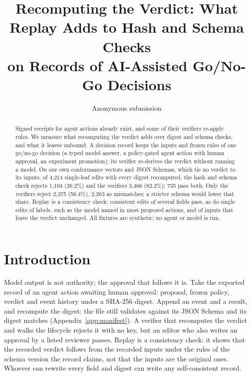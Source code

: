 \documentclass[letterpaper]{article} %
\title{Recomputing the Verdict: What Replay Adds to Hash and Schema Checks\\
on Records of AI-Assisted Go/No-Go Decisions}
\author{Anonymous submission}
\author{\paperauthor}
\makeatletter
\def\code@keepspaces{\Url@Edit\Url@String{ }{+}}}
\DeclareRobustCommand{\code}{\leavevmode\begingroup \urlstyle{tt}%
  \let\Url@ObeySp\code@keepspaces \def\Url@space{\penalty\UrlBreakPenalty\ }\Url}
\makeatother
\begin{document}
\maketitle

\begin{abstract}
Signed receipts for agent actions already exist, and some of their verifiers
re-apply rules. We measure what recomputing the verdict adds over digest and
schema checks, and what it leaves unbound. A decision record keeps the inputs
and frozen rules of one go/no-go decision (a typed model answer, a
policy-gated agent action with human approval, an experiment promotion); its
verifier re-derives the verdict without running a model. On our own
conformance vectors and JSON Schemas, which tie no verdict to its inputs, of
4,214 single-leaf edits with every digest recomputed, the hash and schema
check rejects 1,104 (26.2\%) and the verifiers 3,466 (82.2\%); 735 pass
both. Only the verifiers reject 2,375 (56.4\%), 2,263 as mismatches; a
stricter schema would lower that share. Replay is a
consistency check: consistent edits of several fields pass, as do single
edits of labels, such as the model named in most proposed actions,
and of inputs that leave the verdict unchanged. All fixtures are synthetic;
no agent or model is run.
\end{abstract}

\section{Introduction}
\label{sec:intro}

Model output is not authority; the approval that follows it is. Take the
exported record of an agent action awaiting human approval: proposal, frozen
policy, verdict and event history under a SHA-256 digest. Append an
\code{EXECUTED} event and a result, and recompute the digest: the file still
validates against its JSON Schema and its digest matches
(Appendix~\ref{app:manifest}). A verifier that recomputes the verdict and
walks the lifecycle rejects it with no key, but an editor who also writes an
approval by a listed reviewer passes. Replay is a consistency check: it shows
that the recorded verdict follows from the recorded inputs under the rules
of the schema version the record claims, not that the inputs are the
original ones. Whoever can rewrite every field and digest can write any
self-consistent record.
\end{document}
